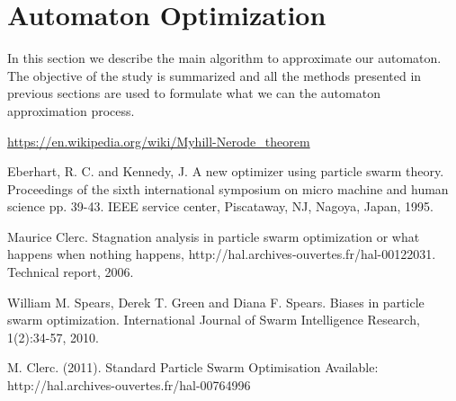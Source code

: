 \documentclass[runningheads,a4paper]{llncs}
\begin{document}
\section{Automaton Optimization}
In this section we describe the main algorithm to approximate our automaton. The objective of the study is summarized and all the methods presented in previous sections are used to formulate what we can the automaton approximation process.




\begin{thebibliography}{9}
\url{https://en.wikipedia.org/wiki/Myhill-Nerode_theorem}

Eberhart, R. C. and Kennedy, J. A new optimizer using particle swarm theory. Proceedings of the sixth international symposium on micro machine and human science pp. 39-43. IEEE service center, Piscataway, NJ, Nagoya, Japan, 1995.

Maurice Clerc. Stagnation analysis in particle swarm optimization or what happens when nothing happens, http://hal.archives-ouvertes.fr/hal-00122031. Technical report, 2006.

William M. Spears, Derek T. Green and Diana F. Spears. Biases in particle swarm optimization. International Journal of Swarm Intelligence Research, 1(2):34-57, 2010.


M. Clerc. (2011). Standard Particle Swarm Optimisation Available: http://hal.archives-ouvertes.fr/hal-00764996 

\end{thebibliography}
\end{document}
